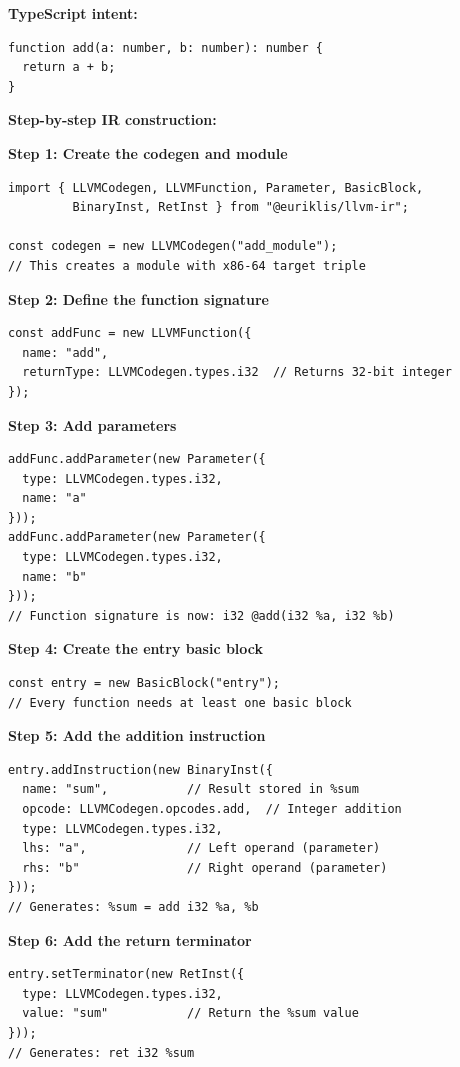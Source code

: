 \documentclass[11pt]{article}
\begin{document}
\textbf{TypeScript intent:}
\begin{lstlisting}[style=ts]
function add(a: number, b: number): number {
  return a + b;
}
\end{lstlisting}

\textbf{Step-by-step IR construction:}

\textbf{Step 1: Create the codegen and module}
\begin{lstlisting}[style=ts]
import { LLVMCodegen, LLVMFunction, Parameter, BasicBlock,
         BinaryInst, RetInst } from "@euriklis/llvm-ir";

const codegen = new LLVMCodegen("add_module");
// This creates a module with x86-64 target triple
\end{lstlisting}

\textbf{Step 2: Define the function signature}
\begin{lstlisting}[style=ts]
const addFunc = new LLVMFunction({
  name: "add",
  returnType: LLVMCodegen.types.i32  // Returns 32-bit integer
});
\end{lstlisting}

\textbf{Step 3: Add parameters}
\begin{lstlisting}[style=ts]
addFunc.addParameter(new Parameter({
  type: LLVMCodegen.types.i32,
  name: "a"
}));
addFunc.addParameter(new Parameter({
  type: LLVMCodegen.types.i32,
  name: "b"
}));
// Function signature is now: i32 @add(i32 %a, i32 %b)
\end{lstlisting}

\textbf{Step 4: Create the entry basic block}
\begin{lstlisting}[style=ts]
const entry = new BasicBlock("entry");
// Every function needs at least one basic block
\end{lstlisting}

\textbf{Step 5: Add the addition instruction}
\begin{lstlisting}[style=ts]
entry.addInstruction(new BinaryInst({
  name: "sum",           // Result stored in %sum
  opcode: LLVMCodegen.opcodes.add,  // Integer addition
  type: LLVMCodegen.types.i32,
  lhs: "a",              // Left operand (parameter)
  rhs: "b"               // Right operand (parameter)
}));
// Generates: %sum = add i32 %a, %b
\end{lstlisting}

\textbf{Step 6: Add the return terminator}
\begin{lstlisting}[style=ts]
entry.setTerminator(new RetInst({
  type: LLVMCodegen.types.i32,
  value: "sum"           // Return the %sum value
}));
// Generates: ret i32 %sum
\end{lstlisting}
\end{document}
